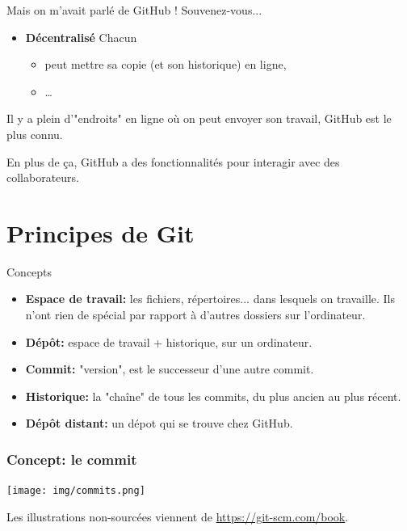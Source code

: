 \documentclass{beamer}
\begin{document}
\begin{frame}{Mais on m'avait parlé de GitHub !}
    Souvenez-vous...
    \begin{itemize}
        \item \textbf{Décentralisé} Chacun
            \begin{itemize}
                \item peut mettre sa copie (et son historique) en ligne,
                \item \dots
            \end{itemize}
    \end{itemize}

    Il y a plein d'"endroits" en ligne o\`u on peut envoyer son travail, GitHub
    est le plus connu.

    En plus de ça, GitHub a des fonctionnalités pour interagir avec des collaborateurs.
\end{frame}

\section{Principes de Git}

\begin{frame}{Concepts}
    \begin{itemize}
        \item \textbf{Espace de travail:}
            les fichiers, répertoires... dans lesquels on
            travaille. Ils n'ont rien de spécial par rapport à d'autres dossiers
            sur l'ordinateur.
        \item \textbf{Dépôt:} espace de travail + historique, sur un ordinateur.
        \item \textbf{Commit:} "version", est le successeur d'une autre commit.
        \item \textbf{Historique:} la "chaîne" de tous les commits, du plus ancien au plus récent.
        \item \textbf{Dépôt distant:} un dépot qui se trouve chez GitHub.
    \end{itemize}
\end{frame}

\begin{frame}
\frametitle{Concept: le \textbf{commit}}

\begin{center}
    \texttt{[image: img/commits.png]}
\end{center}
\footnotesize{Les illustrations non-sourcées viennent de \url{https://git-scm.com/book}.}
\end{frame}
\end{document}
